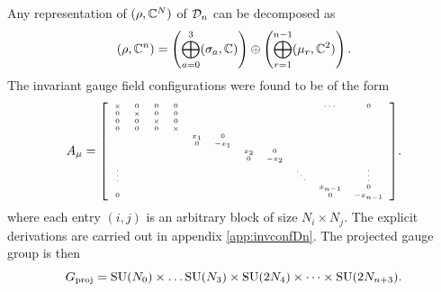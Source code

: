         Any representation of $(\rho,\mathbb{C}^N)$ of $\mathcal{D}_n$ can be decomposed as
        \begin{equation}
            (\rho,\mathbb{C}^n) = \left( \bigoplus^3_{a=0}(\sigma_a,\mathbb{C}) \right)\oplus\left( \bigoplus^{n-1}_{r=1}(\mu_r,\mathbb{C}^2) \right).
        \end{equation}
        The invariant gauge field configurations were found to be of the form
        \begin{equation}
            A_\mu=
            {\tiny
            \left[
            \begin{array}{*{20}c}
                \times & 0 & 0 & 0 & & & & & & \cdots & 0 \\
                0 & \times & 0 & 0 & & & & & & & \\
                0 & 0 & \times & 0 & & & & & & & \\
                0 & 0 & 0 & \times & & & & & & & \\
                & & & & x_1 & 0 & & & & & \\
                & & & & 0 & -x_1 & & & & & \\
                & & & & & & x_2 & 0 & & & \\
                & & & & & & 0 & -x_2 & & & \\
                \vdots & & & & & & & & \ddots & & \vdots \\
                & & & & & & & & & x_{n-1} & 0 \\
                0 & & & & & & & & & 0 & -x_{n-1}
        \end{array}
        \right]}.\label{eq:invformAmuDn}
        \end{equation}
        where each entry $(i,j)$ is an arbitrary block of size $N_i\times N_j$. The explicit derivations are carried out in appendix \ref{app:invconfDn}. The projected gauge group is then
        \begin{equation}
            G_{\text{proj}} = \text{SU}(N_0)\times\dots\text{SU}(N_3)\times\text{SU}(2N_4)\times\dots\times\text{SU}(2N_{n+3}).
        \end{equation}


